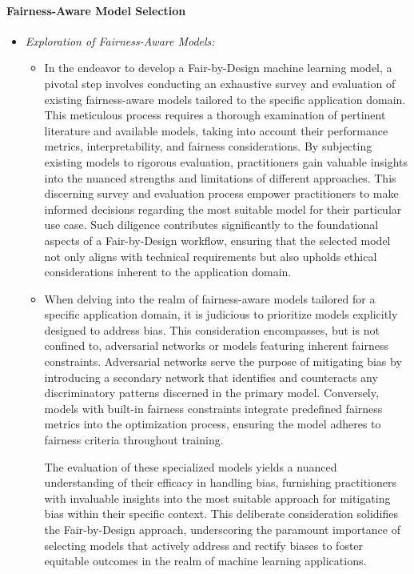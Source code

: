 \paragraph{Fairness-Aware Model Selection}

\begin{itemize}

    \item \emph{Exploration of Fairness-Aware Models:}
     
    \begin{itemize}
    
        \item In the endeavor to develop a Fair-by-Design machine learning model, a pivotal step involves conducting an exhaustive survey and evaluation of existing fairness-aware models tailored to the specific application domain. This meticulous process requires a thorough examination of pertinent literature and available models, taking into account their performance metrics, interpretability, and fairness considerations. By subjecting existing models to rigorous evaluation, practitioners gain valuable insights into the nuanced strengths and limitations of different approaches. This discerning survey and evaluation process empower practitioners to make informed decisions regarding the most suitable model for their particular use case. Such diligence contributes significantly to the foundational aspects of a Fair-by-Design workflow, ensuring that the selected model not only aligns with technical requirements but also upholds ethical considerations inherent to the application domain.
    
        \item When delving into the realm of fairness-aware models tailored for a specific application domain, it is judicious to prioritize models explicitly designed to address bias. This consideration encompasses, but is not confined to, adversarial networks or models featuring inherent fairness constraints. Adversarial networks serve the purpose of mitigating bias by introducing a secondary network that identifies and counteracts any discriminatory patterns discerned in the primary model. Conversely, models with built-in fairness constraints integrate predefined fairness metrics into the optimization process, ensuring the model adheres to fairness criteria throughout training.

        The evaluation of these specialized models yields a nuanced understanding of their efficacy in handling bias, furnishing practitioners with invaluable insights into the most suitable approach for mitigating bias within their specific context. This deliberate consideration solidifies the Fair-by-Design approach, underscoring the paramount importance of selecting models that actively address and rectify biases to foster equitable outcomes in the realm of machine learning applications.    
    

\end{itemize}
\end{itemize}
